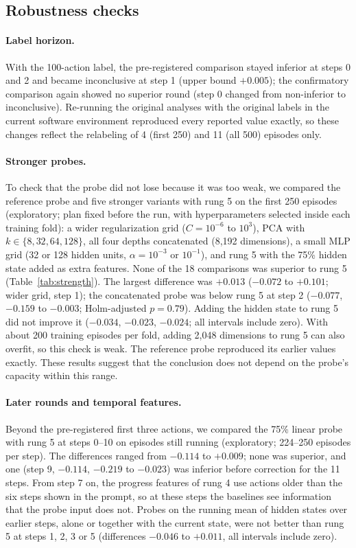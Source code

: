 \documentclass[11pt]{article}
\begin{document}
\subsection{Robustness checks}\label{sec:robust}
\paragraph{Label horizon.} With the 100-action label, the pre-registered comparison stayed inferior at steps 0 and 2 and became inconclusive at step 1 (upper bound $+0.005$);
the confirmatory comparison again showed no superior round (step 0 changed from non-inferior to inconclusive). Re-running the original analyses with the original labels in the current
software environment reproduced every reported value exactly, so these changes reflect the relabeling of 4 (first 250) and 11 (all 500) episodes only.

\paragraph{Stronger probes.} To check that the probe did not lose because it was too weak, we compared the reference probe and five stronger variants with rung 5 on the first 250 episodes (exploratory; plan fixed before the run, with hyperparameters selected inside each training fold):
a wider regularization grid ($C = 10^{-6}$ to $10^{3}$), PCA with $k \in \{8, 32, 64, 128\}$, all four depths concatenated (8,192 dimensions), a small MLP grid (32 or 128 hidden units, $\alpha = 10^{-3}$ or $10^{-1}$), and rung 5 with the 75\% hidden state added as extra features.
None of the 18 comparisons was superior to rung 5 (Table~\ref{tab:strength}). The largest difference was $+0.013$ ($-0.072$ to $+0.101$; wider grid, step 1); the concatenated probe was below rung 5 at step 2 ($-0.077$, $-0.159$ to $-0.003$; Holm-adjusted $p = 0.79$).
Adding the hidden state to rung 5 did not improve it ($-0.034$, $-0.023$, $-0.024$; all intervals include zero). With about 200 training episodes per fold, adding 2,048 dimensions to rung 5 can also overfit, so this check is weak. The reference probe reproduced its earlier values exactly. These results suggest that the conclusion does not depend on the probe's capacity within this range.

\paragraph{Later rounds and temporal features.} Beyond the pre-registered first three actions, we compared the 75\% linear probe with rung 5 at steps 0--10 on episodes still running (exploratory; 224--250 episodes per step).
The differences ranged from $-0.114$ to $+0.009$; none was superior, and one (step 9, $-0.114$, $-0.219$ to $-0.023$) was inferior before correction for the 11 steps. From step 7 on, the progress features of rung 4 use actions older than the six steps shown in the prompt, so at these steps the baselines see information that the probe input does not.
Probes on the running mean of hidden states over earlier steps, alone or together with the current state, were not better than rung 5 at steps 1, 2, 3 or 5 (differences $-0.046$ to $+0.011$, all intervals include zero).
\end{document}
